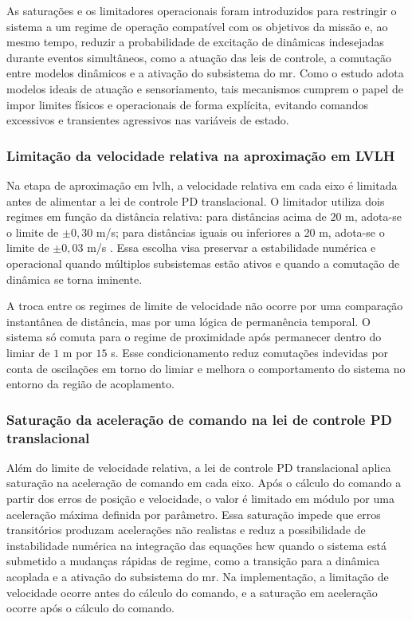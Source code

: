 As saturações e os limitadores operacionais foram introduzidos para restringir o sistema a um regime de operação compatível com os objetivos da missão e, ao mesmo tempo, reduzir a probabilidade de excitação de dinâmicas indesejadas durante eventos simultâneos, como a atuação das leis de controle, a comutação entre modelos dinâmicos e a ativação do subsistema do \gls{mr}.
Como o estudo adota modelos ideais de atuação e sensoriamento, tais mecanismos cumprem o papel de impor limites físicos e operacionais de forma explícita, evitando comandos excessivos e transientes agressivos nas variáveis de estado.

\subsubsection{Limitação da velocidade relativa na aproximação em LVLH}
\label{subsubsec_limitacao_veloc_relativa_lvlh}

Na etapa de aproximação em \gls{lvlh}, a velocidade relativa em cada eixo é limitada antes de alimentar a lei de controle PD translacional.
O limitador utiliza dois regimes em função da distância relativa: para distâncias acima de $20$ m, adota-se o limite de $\pm 0{,}30$ m/s; para distâncias iguais ou inferiores a 20 m, adota-se o limite de $\pm 0{,}03$ m/s \cite{vedant2025longrange}. 
Essa escolha visa preservar a estabilidade numérica e operacional quando múltiplos subsistemas estão ativos e quando a comutação de dinâmica se torna iminente.

A troca entre os regimes de limite de velocidade não ocorre por uma comparação instantânea de distância, mas por uma lógica de permanência temporal.
O sistema só comuta para o regime de proximidade após permanecer dentro do limiar de $1$ m por $15$ s.
Esse condicionamento reduz comutações indevidas por conta de oscilações em torno do limiar e melhora o comportamento do sistema no entorno da região de acoplamento.

\subsubsection{Saturação da aceleração de comando na lei de controle PD translacional}
\label{subsubsec_saturacao_acel_pd_translacional}

Além do limite de velocidade relativa, a lei de controle PD translacional aplica saturação na aceleração de comando em cada eixo.
Após o cálculo do comando a partir dos erros de posição e velocidade, o valor é limitado em módulo por uma aceleração máxima definida por parâmetro.
Essa saturação impede que erros transitórios produzam acelerações não realistas e reduz a possibilidade de instabilidade numérica na integração das equações \gls{hcw} quando o sistema está submetido a mudanças rápidas de regime, como a transição para a dinâmica acoplada e a ativação do subsistema do \gls{mr}.
Na implementação, a limitação de velocidade ocorre antes do cálculo do comando, e a saturação em aceleração ocorre após o cálculo do comando.

